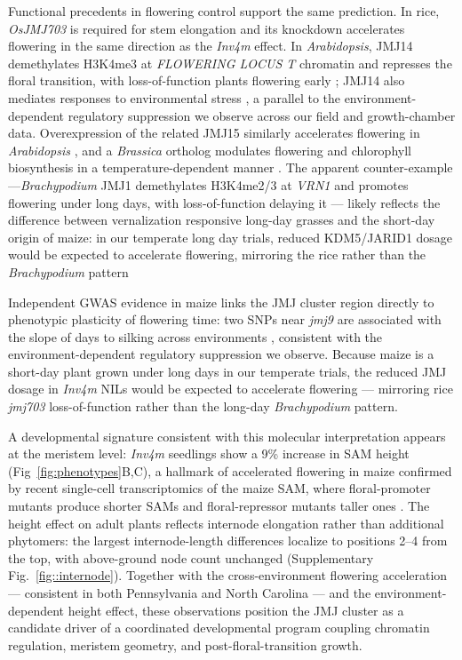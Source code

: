 \documentclass[9pt,twocolumn,twoside]{rilabRxiv}
\newcommand{\invfour}{\textit{Inv4m}\xspace}
\begin{document}
Functional precedents in flowering control support the same prediction. 
In rice, \textit{OsJMJ703} is required for stem elongation \citep{chen2013} and its knockdown accelerates flowering \citep{song2019-jm} in the same direction as the \invfour effect. 
In \textit{Arabidopsis}, JMJ14 demethylates H3K4me3 at \textit{FLOWERING LOCUS T} chromatin and represses the floral transition, with loss-of-function plants flowering early \citep{Lu2010-bn, yang2012a}; JMJ14 also mediates responses to environmental stress \citep{Cui2021-sf, Sun2021-ib}, a parallel to the environment-dependent regulatory suppression we observe across our field and growth-chamber data. 
Overexpression of the related JMJ15 similarly accelerates flowering in \textit{Arabidopsis} \citep{yang2012b}, and a \textit{Brassica} ortholog modulates flowering and chlorophyll biosynthesis in a temperature-dependent manner \citep{Xin2024-zb}. 
The apparent counter-example ---\textit{Brachypodium} JMJ1 demethylates H3K4me2/3 at \textit{VRN1} and promotes flowering under long days, with loss-of-function delaying it \citep{Liu2024-aq} --- likely reflects the difference between vernalization responsive long-day grasses and the short-day origin of maize: in our temperate long day trials, reduced KDM5/JARID1 dosage would be expected to accelerate flowering, mirroring the rice rather than the \textit{Brachypodium} pattern

Independent GWAS evidence in maize links the JMJ cluster region directly to phenotypic plasticity of flowering time: two SNPs near \textit{jmj9} are associated with the slope of days to silking across environments \citep{tibbs-cortes2024}, consistent with the environment-dependent regulatory suppression we observe.
Because maize is a short-day plant grown under long days in our temperate trials, the reduced JMJ dosage in \invfour NILs would be expected to accelerate flowering --- mirroring rice \textit{jmj703} loss-of-function rather than the long-day \textit{Brachypodium} pattern.
 
A developmental signature consistent with this molecular interpretation appears at the meristem level: \invfour seedlings show a 9\% increase in SAM height (Fig~\ref{fig:phenotypes}B,C), a hallmark of accelerated flowering in maize \citep{danilevskaya2008, wu2008, leiboff2015, thompson2015} confirmed by recent single-cell transcriptomics of the maize SAM, where floral-promoter mutants produce shorter SAMs and floral-repressor mutants taller ones \citep{dong2026}.
The height effect on adult plants reflects internode elongation rather than additional phytomers: the largest internode-length differences localize to positions 2--4 from the top, with above-ground node count unchanged (Supplementary Fig.~\ref{fig::internode}).
Together with the cross-environment flowering acceleration --- consistent in both Pennsylvania and North Carolina --- and the environment-dependent height effect, these observations position the JMJ cluster as a candidate driver of a coordinated developmental program coupling chromatin regulation, meristem geometry, and post-floral-transition growth.
 
\end{document}
